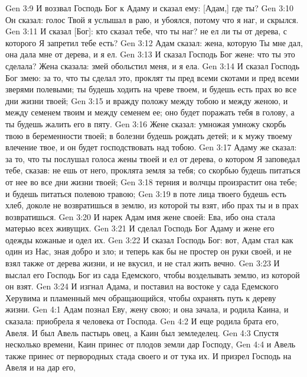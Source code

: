 \vs Gen 3:9 И воззвал Господь Бог к Адаму и сказал ему: [Адам,] где ты?
\vs Gen 3:10 Он сказал: голос Твой я услышал в раю, и убоялся, потому что я наг, и скрылся.
\vs Gen 3:11 И сказал [Бог]: кто сказал тебе, что ты наг? не ел ли ты от дерева, с которого Я запретил тебе есть?
\vs Gen 3:12 Адам сказал: жена, которую Ты мне дал, она дала мне от дерева, и я ел.
\vs Gen 3:13 И сказал Господь Бог жене: что ты это сделала? Жена сказала: змей обольстил меня, и я ела.
\rsbpar\vs Gen 3:14 И сказал Господь Бог змею: за то, что ты сделал это, проклят ты пред всеми скотами и пред всеми зверями полевыми; ты будешь ходить на чреве твоем, и будешь есть прах во все дни жизни твоей;
\vs Gen 3:15 и вражду положу между тобою и между женою, и между семенем твоим и между семенем ее; оно будет поражать тебя в голову, а ты будешь жалить его в пяту.
\rsbpar\vs Gen 3:16 Жене сказал: умножая умножу скорбь твою в беременности твоей; в болезни будешь рождать детей; и к мужу твоему влечение твое, и он будет господствовать над тобою.
\vs Gen 3:17 Адаму же сказал: за то, что ты послушал голоса жены твоей и ел от дерева, о котором Я заповедал тебе, сказав: не ешь от него, проклята земля за тебя; со скорбью будешь питаться от нее во все дни жизни твоей;
\vs Gen 3:18 терния и волчцы произрастит она тебе; и будешь питаться полевою травою;
\vs Gen 3:19 в поте лица твоего будешь есть хлеб, доколе не возвратишься в землю, из которой ты взят, ибо прах ты и в прах возвратишься.
\vs Gen 3:20 И нарек Адам имя жене своей: Ева, ибо она стала матерью всех живущих.
\rsbpar\vs Gen 3:21 И сделал Господь Бог Адаму и жене его одежды кожаные и одел их.
\rsbpar\vs Gen 3:22 И сказал Господь Бог: вот, Адам стал как один из Нас, зная добро и зло; и теперь как бы не простер он руки своей, и не взял также от дерева жизни, и не вкусил, и не стал жить вечно.
\vs Gen 3:23 И выслал его Господь Бог из сада Едемского, чтобы возделывать землю, из которой он взят.
\vs Gen 3:24 И изгнал Адама, и поставил на востоке у сада Едемского Херувима и пламенный меч обращающийся, чтобы охранять путь к дереву жизни.
\vs Gen 4:1 Адам познал Еву, жену свою; и она зачала, и родила Каина, и сказала: приобрела я человека от Господа.
\vs Gen 4:2 И еще родила брата его, Авеля. И был Авель пастырь овец, а Каин был земледелец.
\rsbpar\vs Gen 4:3 Спустя несколько времени, Каин принес от плодов земли дар Господу,
\vs Gen 4:4 и Авель также принес от первородных стада своего и от тука их. И призрел Господь на Авеля и на дар его,
